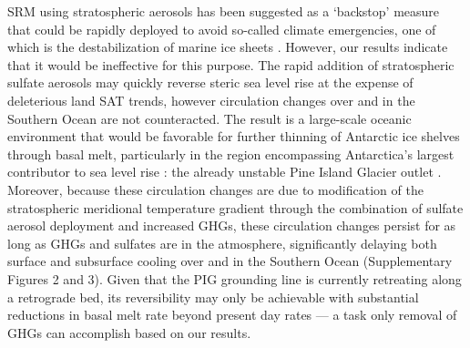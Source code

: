 \documentclass{nature}
\begin{document}
SRM using stratospheric aerosols has been suggested as a `backstop' measure that could be rapidly deployed to avoid so-called climate emergencies, one of which is the destabilization of marine ice sheets \cite{blackstock09}. However, our results indicate that it would be ineffective for this purpose. The rapid addition of stratospheric sulfate aerosols may quickly reverse steric sea level rise at the expense of deleterious land SAT trends, however circulation changes over and in the Southern Ocean are not counteracted. The result is a large-scale oceanic environment that would be favorable for further thinning of Antarctic ice shelves through basal melt, particularly in the region encompassing Antarctica's largest contributor to sea level rise \cite{shepherd12}: the already unstable Pine Island Glacier outlet \cite{rignot14}. Moreover, because these circulation changes are due to modification of the stratospheric meridional temperature gradient through the combination of sulfate aerosol deployment and increased GHGs, these circulation changes persist for as long as GHGs and sulfates are in the atmosphere, significantly delaying both surface and subsurface cooling over and in the Southern Ocean (Supplementary Figures 2 and 3). Given that the PIG grounding line is currently retreating along a retrograde bed, its reversibility may only be achievable with substantial reductions in basal melt rate beyond present day rates \cite{favier14} --- a task only removal of GHGs can accomplish based on our results. 
\end{document}
